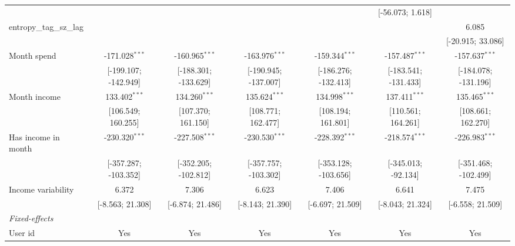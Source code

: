 \begin{table}[htbp]
\begin{threeparttable}[b]
\begin{tabular}{lcccccc}
                                          &                      &                      &                      &                      & [-56.073; 1.618]     &   \\   
         entropy\_tag\_sz\_lag            &                      &                      &                      &                      &                      & 6.085\\   
                                          &                      &                      &                      &                      &                      & [-20.915; 33.086]\\   
         Month spend                      & -171.028$^{***}$     & -160.965$^{***}$     & -163.976$^{***}$     & -159.344$^{***}$     & -157.487$^{***}$     & -157.637$^{***}$\\   
                                          & [-199.107; -142.949] & [-188.301; -133.629] & [-190.945; -137.007] & [-186.276; -132.413] & [-183.541; -131.433] & [-184.078; -131.196]\\   
         Month income                     & 133.402$^{***}$      & 134.260$^{***}$      & 135.624$^{***}$      & 134.998$^{***}$      & 137.411$^{***}$      & 135.465$^{***}$\\   
                                          & [106.549; 160.255]   & [107.370; 161.150]   & [108.771; 162.477]   & [108.194; 161.801]   & [110.561; 164.261]   & [108.661; 162.270]\\   
         Has income in month              & -230.320$^{***}$     & -227.508$^{***}$     & -230.530$^{***}$     & -228.392$^{***}$     & -218.574$^{***}$     & -226.983$^{***}$\\   
                                          & [-357.287; -103.352] & [-352.205; -102.812] & [-357.757; -103.302] & [-353.128; -103.656] & [-345.013; -92.134]  & [-351.468; -102.499]\\   
         Income variability               & 6.372                & 7.306                & 6.623                & 7.406                & 6.641                & 7.475\\   
                                          & [-8.563; 21.308]     & [-6.874; 21.486]     & [-8.143; 21.390]     & [-6.697; 21.509]     & [-8.043; 21.324]     & [-6.558; 21.509]\\   
         \midrule
         \emph{Fixed-effects}\\
         User id                          & Yes                  & Yes                  & Yes                  & Yes                  & Yes                  & Yes\\  

\end{tabular}
\end{threeparttable}
\end{table}
